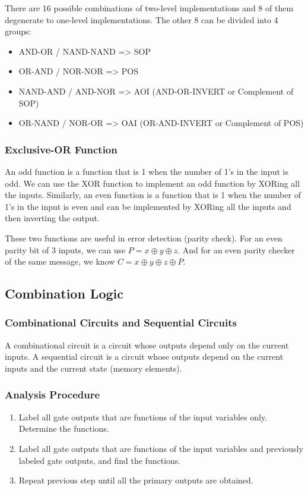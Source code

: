\documentclass[a4paper,12pt]{article}
\begin{document}
There are 16 possible combinations of two-level implementations and 8 of them degenerate to one-level implementations.
The other 8 can be divided into 4 groups:
\begin{itemize}
	\item AND-OR / NAND-NAND => SOP
	\item OR-AND / NOR-NOR => POS
	\item NAND-AND / AND-NOR => AOI (AND-OR-INVERT or Complement of SOP)
	\item OR-NAND / NOR-OR => OAI (OR-AND-INVERT or Complement of POS)
\end{itemize}

\subsubsection{Exclusive-OR Function}

An odd function is a function that is 1 when the number of 1's in the input is odd.
We can use the XOR function to implement an odd function by XORing all the inputs.
Similarly, an even function is a function that is 1 when the number of 1's in the input is even and can be implemented by XORing all the inputs and then inverting the output.

These two functions are useful in error detection (parity check).
For an even parity bit of 3 inputs, we can use $P = x \oplus y \oplus z$.
And for an even parity checker of the same message, we know $C = x \oplus y \oplus z \oplus P$.

\subsection{Combination Logic}

\subsubsection{Combinational Circuits and Sequential Circuits}

A combinational circuit is a circuit whose outputs depend only on the current inputs.
A sequential circuit is a circuit whose outputs depend on the current inputs and the current state (memory elements).

\subsubsection{Analysis Procedure}

\begin{enumerate}
	\item Label all gate outputs that are functions of the input variables only. Determine the functions.
	\item Label all gate outputs that are functions of the input variables and previously labeled gate outputs, and find the functions.
	\item Repeat previous step until all the primary outputs are obtained.
\end{enumerate}
\end{document}
